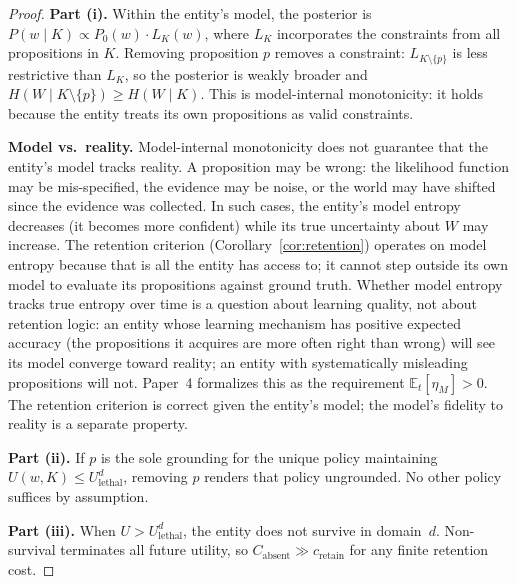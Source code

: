 \documentclass[11pt]{article}
\theoremstyle{definition}
\theoremstyle{remark}
\begin{document}
\begin{proof}
\textbf{Part (i).} Within the entity's model, the posterior is
$P(w \mid K) \propto P_0(w) \cdot L_K(w)$, where $L_K$ incorporates the
constraints from all propositions in $K$. Removing proposition $p$
removes a constraint: $L_{K \setminus \{p\}}$ is less restrictive than
$L_K$, so the posterior is weakly broader and $H(W \mid K \setminus
\{p\}) \geq H(W \mid K)$. This is model-internal monotonicity: it
holds because the entity treats its own propositions as valid
constraints.

\textbf{Model vs.\ reality.} Model-internal monotonicity does not
guarantee that the entity's model tracks reality. A proposition may be
wrong: the likelihood function may be mis-specified, the evidence may be
noise, or the world may have shifted since the evidence was collected.
In such cases, the entity's model entropy decreases (it becomes more
confident) while its true uncertainty about $W$ may increase. The
retention criterion (Corollary~\ref{cor:retention}) operates on model
entropy because that is all the entity has access to; it cannot step
outside its own model to evaluate its propositions against ground truth.
Whether model entropy tracks true entropy over time is a question about
learning quality, not about retention logic: an entity whose learning
mechanism has positive expected accuracy (the propositions it acquires
are more often right than wrong) will see its model converge toward
reality; an entity with systematically misleading propositions will not.
Paper~4 \cite{McCarthy2026d} formalizes this as the requirement
$\mathbb{E}_t[\eta_M] > 0$.
The retention criterion is correct given the entity's model; the model's
fidelity to reality is a separate property.

\textbf{Part (ii).} If $p$ is the sole grounding for the unique
policy maintaining $U(w, K) \leq U_{\text{lethal}}^d$, removing $p$
renders that policy ungrounded. No other policy suffices by assumption.

\textbf{Part (iii).} When $U > U_{\text{lethal}}^d$, the entity does
not survive in domain~$d$. Non-survival terminates all future utility,
so $C_{\text{absent}} \gg c_{\text{retain}}$ for any finite retention
cost.
\end{proof}
\end{document}
